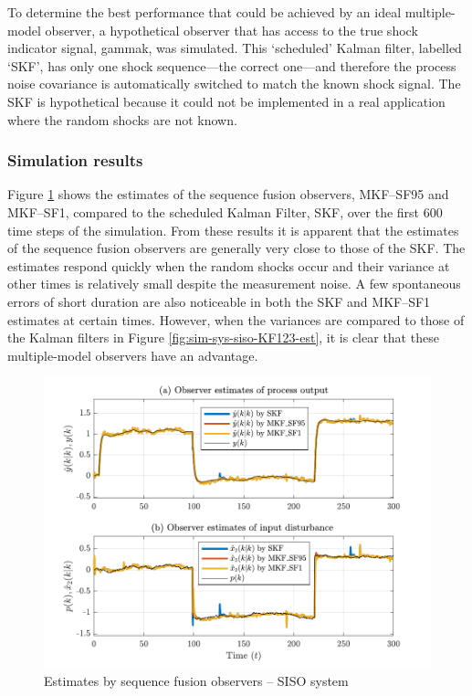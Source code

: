 To determine the best performance that could be achieved by an ideal multiple-model observer, a hypothetical observer that has access to the true shock indicator signal, \gls{gammak}, was simulated. This `scheduled' Kalman filter, labelled ‘SKF’, has only one shock sequence---the correct one---and therefore the process noise covariance is automatically switched to match the known shock signal. The SKF is hypothetical because it could not be implemented in a real application where the random shocks are not known.

\subsubsection{Simulation results} \label{sim-obs-lin-1-results}

Figure \ref{fig:rod-obs-sim1-yest-1-SF} shows the estimates of the sequence fusion observers, MKF--SF95 and MKF--SF1, compared to the scheduled Kalman Filter, SKF, over the first 600 time steps of the simulation. From these results it is apparent that the estimates of the sequence fusion observers are generally very close to those of the SKF. The estimates respond quickly when the random shocks occur and their variance at other times is relatively small despite the measurement noise. A few spontaneous errors of short duration are also noticeable in both the SKF and MKF--SF1 estimates at certain times. However, when the variances are compared to those of the Kalman filters in Figure \ref{fig:sim-sys-siso-KF123-est}, it is clear that these multiple-model observers have an advantage.
\begin{figure}[htp]
	\centering
	\includegraphics[width=13cm]{images/rod_obs_sim1_all_seed_y_est1_SF95_SF1.pdf}
	\caption{Estimates by sequence fusion observers – SISO system}
	\label{fig:rod-obs-sim1-yest-1-SF}
\end{figure}

